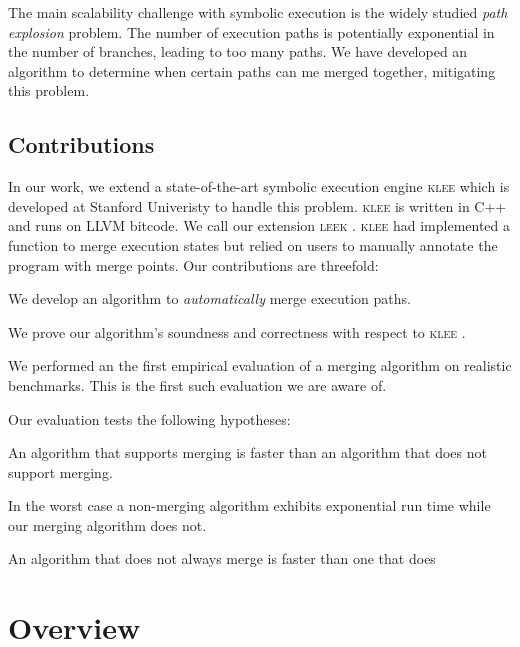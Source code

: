 \documentclass[12pt,a4paper]{article}
\newcommand{\klee}{\textsc{klee }}
\newcommand{\leek}{\textsc{leek }}
\begin{document}
The main scalability challenge with symbolic execution is the widely studied \emph{path explosion} problem. The number of execution paths is potentially exponential in the number of branches, leading to too many paths. We have developed an algorithm to determine when certain paths can me merged together, mitigating this problem.

\subsection{Contributions}

In our work, we extend a state-of-the-art symbolic execution engine \klee \cite{klee} which is developed at Stanford Univeristy to handle this problem. \klee is written in C++ and runs on LLVM bitcode. We call our extension \leek. \klee had implemented a function to merge execution states but relied on users to manually annotate the program with merge points. Our contributions are threefold:

\linespread{0}
\begin{enumerate*}

\item We develop an algorithm to \emph{automatically} merge execution paths.
\item We prove our algorithm's soundness and correctness with respect to \klee.
\item We performed an the first empirical evaluation of a merging algorithm on realistic benchmarks. This is the first such evaluation we are aware of.

\end{enumerate*}

Our evaluation tests the following hypotheses:

\begin{enumerate*}
\item An algorithm that supports merging is faster than an algorithm that does not support merging.
\item In the worst case a non-merging algorithm exhibits exponential run time while our merging algorithm does not.
\item An algorithm that does not always merge is faster than one that does

\end{enumerate*}

\section{Overview}\label{overview}
\end{document}
